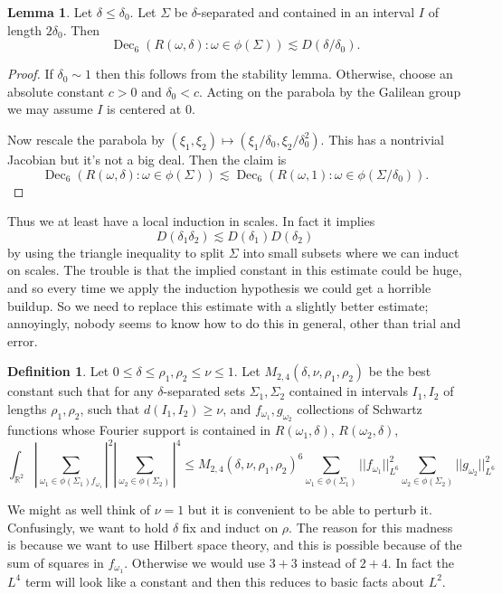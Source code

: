 \documentclass[12pt]{report}
\newcommand{\RR}{\mathbb{R}}
\newcommand{\Dec}{\operatorname{Dec}}
\theoremstyle{definition}
\newtheorem{lemma}[theorem]{Lemma}
\newtheorem{definition}[theorem]{Definition}
\begin{document}
\begin{lemma}
Let $\delta \leq \delta_0.$ Let $\Sigma$ be $\delta$-separated and contained in an interval $I$ of length $2\delta_0$. Then
$$\Dec_6(R(\omega, \delta):\omega \in \phi(\Sigma)) \lesssim D(\delta/\delta_0).$$
\end{lemma}
\begin{proof}
If $\delta_0 \sim 1$ then this follows from the stability lemma. Otherwise, choose an absolute constant $c > 0$ and $\delta_0 < c$.
Acting on the parabola by the Galilean group we may assume $I$ is centered at $0$.

Now rescale the parabola by $(\xi_1, \xi_2) \mapsto (\xi_1/\delta_0, \xi_2/\delta_0^2)$. This has a nontrivial Jacobian but it's not a big deal. Then the claim is
$$\Dec_6(R(\omega, \delta): \omega \in \phi(\Sigma)) \lesssim \Dec_6(R(\omega, 1): \omega \in \phi(\Sigma/\delta_0)).$$
\end{proof}
Thus we at least have a local induction in scales. In fact it implies
$$D(\delta_1\delta_2) \lesssim D(\delta_1) D(\delta_2)$$
by using the triangle inequality to split $\Sigma$ into small subsets where we can induct on scales.
The trouble is that the implied constant in this estimate could be huge, and so every time we apply the induction hypothesis we could get a horrible buildup.
So we need to replace this estimate with a slightly better estimate; annoyingly, nobody seems to know how to do this in general, other than trial and error.

\begin{definition}
Let $0 \leq \delta \leq \rho_1, \rho_2 \leq \nu \leq 1$. Let $M_{2,4}(\delta, \nu, \rho_1, \rho_2)$ be the best constant such that
for any $\delta$-separated sets $\Sigma_1,\Sigma_2$ contained in intervals $I_1,I_2$ of lengths $\rho_1,\rho_2$, such that $d(I_1, I_2) \geq \nu$,
and $f_{\omega_1},g_{\omega_2}$ collections of Schwartz functions whose Fourier support is contained in $R(\omega_1,\delta)$, $R(\omega_2,\delta)$,
$$\int_{\RR^2}|\sum_{\omega_1 \in \phi(\Sigma_1) f_{\omega_1}}|^2 |\sum_{\omega_2 \in \phi(\Sigma_2)}|^4
\leq M_{2,4}(\delta, \nu, \rho_1, \rho_2)^6 \sum_{\omega_1 \in \phi(\Sigma_1)} ||f_{\omega_1}||_{L^6}^2 \sum_{\omega_2 \in \phi(\Sigma_2)} ||g_{\omega_2}||_{L^6}^2$$
\end{definition}
We might as well think of $\nu = 1$ but it is convenient to be able to perturb it. Confusingly, we want to hold $\delta$ fix and induct on $\rho$.
The reason for this madness is because we want to use Hilbert space theory, and this is possible because of the sum of squares in $f_{\omega_1}$.
Otherwise we would use $3+3$ instead of $2+4$. In fact the $L^4$ term will look like a constant and then this reduces to basic facts about $L^2$.
\end{document}
